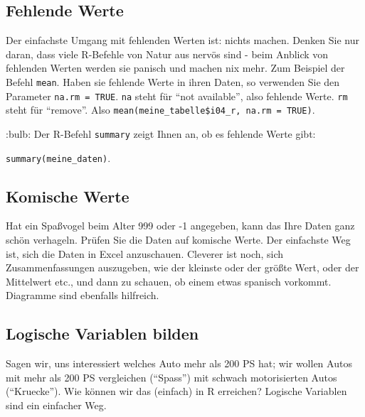\documentclass[]{article}
\newenvironment{Shaded}{\begin{snugshade}}{\end{snugshade}}
\newcommand{\DecValTok}[1]{\textcolor[rgb]{0.00,0.00,0.81}{#1}}
\newcommand{\NormalTok}[1]{#1}
\newcommand{\OperatorTok}[1]{\textcolor[rgb]{0.81,0.36,0.00}{\textbf{#1}}}
\newcommand{\StringTok}[1]{\textcolor[rgb]{0.31,0.60,0.02}{#1}}
\begin{document}
\hypertarget{fehlende-werte}{%
\subsection{Fehlende Werte}\label{fehlende-werte}}

Der einfachste Umgang mit fehlenden Werten ist: nichts machen. Denken
Sie nur daran, dass viele R-Befehle von Natur aus nervös sind - beim
Anblick von fehlenden Werten werden sie panisch und machen nix mehr. Zum
Beispiel der Befehl \texttt{mean}. Haben sie fehlende Werte in ihren
Daten, so verwenden Sie den Parameter \texttt{na.rm\ =\ TRUE}.
\texttt{na} steht für ``not available'', also fehlende Werte.
\texttt{rm} steht für ``remove''. Also
\texttt{mean(meine\_tabelle\$i04\_r,\ na.rm\ =\ TRUE)}.

:bulb: Der R-Befehl \texttt{summary} zeigt Ihnen an, ob es fehlende
Werte gibt:

\texttt{summary(meine\_daten)}.

\hypertarget{komische-werte}{%
\subsection{Komische Werte}\label{komische-werte}}

Hat ein Spaßvogel beim Alter 999 oder -1 angegeben, kann das Ihre Daten
ganz schön verhageln. Prüfen Sie die Daten auf komische Werte. Der
einfachste Weg ist, sich die Daten in Excel anzuschauen. Cleverer ist
noch, sich Zusammenfassungen auszugeben, wie der kleinste oder der
größte Wert, oder der Mittelwert etc., und dann zu schauen, ob einem
etwas spanisch vorkommt. Diagramme sind ebenfalls hilfreich.

\hypertarget{logische-variablen-bilden}{%
\subsection{Logische Variablen bilden}\label{logische-variablen-bilden}}

Sagen wir, uns interessiert welches Auto mehr als 200 PS hat; wir wollen
Autos mit mehr als 200 PS vergleichen (``Spass'') mit schwach
motorisierten Autos (``Kruecke''). Wie können wir das (einfach) in R
erreichen? Logische Variablen sind ein einfacher Weg.

\begin{Shaded}
\end{Shaded}
\end{document}
